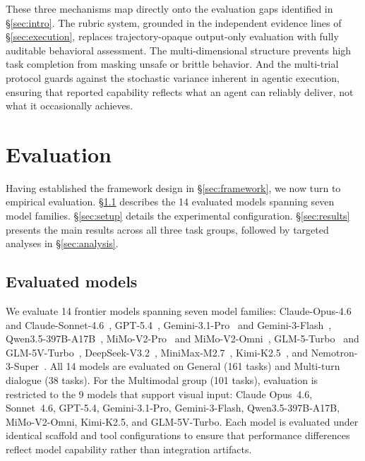 \documentclass{article}
\begin{document}
These three mechanisms map directly onto the evaluation gaps identified in \S\ref{sec:intro}. The rubric system, grounded in the independent evidence lines of \S\ref{sec:execution}, replaces trajectory-opaque output-only evaluation with fully auditable behavioral assessment. The multi-dimensional structure prevents high task completion from masking unsafe or brittle behavior. And the multi-trial protocol guards against the stochastic variance inherent in agentic execution, ensuring that reported capability reflects what an agent can reliably deliver, not what it occasionally achieves.



\section{Evaluation}
\label{sec:evaluation}
 Having established the framework design in \S\ref{sec:framework}, we now turn to empirical evaluation. \S\ref{sec:models} describes the 14 evaluated models spanning seven model families. \S\ref{sec:setup} details the
  experimental configuration. \S\ref{sec:results} presents the main results across all three task groups, followed by targeted analyses in \S\ref{sec:analysis}.
\subsection{Evaluated models}
\label{sec:models}

We evaluate 14 frontier models spanning seven model families:
Claude-Opus-4.6~\citep{opus46} and Claude-Sonnet-4.6~\citep{sonnet46},
GPT-5.4~\citep{gpt54},
Gemini-3.1-Pro~\citep{gemini31pro} and Gemini-3-Flash~\citep{gemini3flash},
Qwen3.5-397B-A17B~\citep{yang2025qwen3},
MiMo-V2-Pro~\citep{mimov2pro} and MiMo-V2-Omni~\citep{mimov2omni},
GLM-5-Turbo~\citep{zeng2026glm} and GLM-5V-Turbo~\citep{glm5vturbo},
DeepSeek-V3.2~\citep{liu2024deepseek},
MiniMax-M2.7~\citep{minimaxm27},
Kimi-K2.5~\citep{team2026kimi},
and Nemotron-3-Super~\citep{blakeman2025nvidia}.
All 14 models are evaluated on General (161 tasks) and Multi-turn dialogue (38 tasks).
For the Multimodal group (101 tasks), evaluation is restricted to the 9 models that support visual input: Claude Opus~4.6, Sonnet~4.6, GPT-5.4, Gemini-3.1-Pro, Gemini-3-Flash, Qwen3.5-397B-A17B, MiMo-V2-Omni, Kimi-K2.5, and GLM-5V-Turbo.
Each model is evaluated under identical scaffold and tool configurations to ensure that performance differences reflect model capability rather than integration artifacts.
\end{document}
